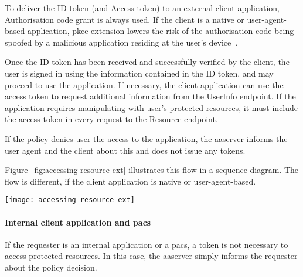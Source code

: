 To deliver the ID token (and Access token) to an external client application, Authorisation code grant is always used. If the client is a native or user-agent-based application, \acrshort{pkce} extension lowers the risk of the authorisation code being spoofed by a malicious application residing at the user's device~\cite{Sakimura2015ProofClients}.

Once the ID token has been received and successfully verified by the client, the user is signed in using the information contained in the ID token, and may proceed to use the application. If necessary, the client application can use the access token to request additional information from the UserInfo endpoint. If the application requires manipulating with user's protected resources, it must include the access token in every request to the Resource endpoint.

If the policy denies user the access to the application, the \acrshort{aaserver} informs the user agent and the client about this and does not issue any tokens.

Figure~\ref{fig:accessing-resource-ext} illustrates this flow in a sequence diagram. The flow is different, if the client application is native or user-agent-based.

\begin{sidewaysfigure}[p]
    \centering
    \texttt{[image: accessing-resource-ext]}
    \caption{Sign-in and access token issuance process to external server-based client application.}
    \label{fig:accessing-resource-ext}
\end{sidewaysfigure}

\paragraph{Internal client application and \acrshort{pacs}}
If the requester is an internal application or a \acrshort{pacs}, a token is not necessary to access protected resources. In this case, the \acrshort{aaserver} simply informs the requester about the policy decision.

